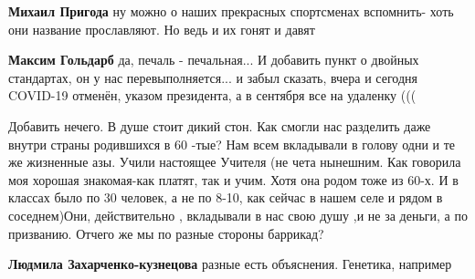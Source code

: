 \begin{itemize}
\begin{itemize}
 
\textbf{Михаил Пригода} ну можно о наших прекрасных спортсменах вспомнить- хоть они название прославляют. Но ведь и их гонят и давят

 
\textbf{Максим Гольдарб} да, печаль - печальная...
И добавить пункт о двойных стандартах, он у нас перевыполняется... и забыл сказать, вчера и сегодня COVID-19 отменён, указом президента, а в сентября все на удаленку (((
\end{itemize}

 

Добавить нечего. В душе стоит дикий стон. Как смогли нас разделить даже внутри
страны родившихся в 60 -тые? Нам всем вкладывали в голову одни и те же жизненные
азы. Учили настоящее Учителя (не чета нынешним. Как говорила моя хорошая
знакомая-как платят, так и учим. Хотя она родом тоже из 60-х. И в классах было по
30 человек, а не по 8-10, как сейчас в нашем селе и рядом в соседнем)Они,
действительно , вкладывали в нас свою душу ,и не за деньги, а по
призванию. Отчего же мы по разные стороны баррикад?

\begin{itemize}
 
\textbf{Людмила Захарченко-кузнецова} разные есть объяснения. Генетика, например

 

\end{itemize}
\end{itemize}
